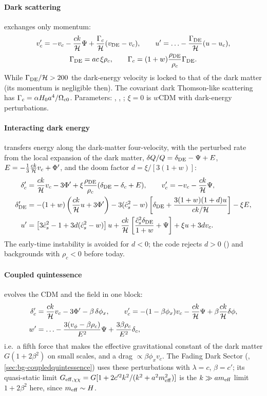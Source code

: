 \paragraph*{Dark scattering} \cite{Simpson2010,BaldiSimpson2015} exchanges only momentum:
\begin{gather}
v_c'=-v_c-\frac{ck}{\mathcal{H}}\Psi+\frac{\Gamma_c}{\mathcal{H}}(v_{\rm DE}-v_c),\qquad u'=\ldots-\frac{\Gamma_{\rm DE}}{\mathcal{H}}(u-u_c),\\
\Gamma_{\rm DE}=ac\,\xi\rho_c,\qquad \Gamma_c=(1+w)\frac{\rho_{\rm DE}}{\rho_c}\Gamma_{\rm DE}.
\end{gather}
While $\Gamma_{\rm DE}/\mathcal{H}>200$ the dark-energy velocity is locked to that of the dark matter (its momentum is negligible
then). The covariant dark Thomson-like scattering has $\Gamma_c=\alpha H_0a^4/\Omega_{c0}$. Parameters: ,
, ; $\xi=0$ is $w$CDM with dark-energy perturbations.

\paragraph*{Interacting dark energy} \cite{Valiviita2008} transfers energy along the dark-matter four-velocity, with
the perturbed rate from the local expansion of the dark matter, $\delta Q/Q=\delta_{\rm DE}-\Psi+E$,
$E=-\frac13\frac{ck}{\mathcal{H}}v_c+\Phi'$, and the doom factor $d=\xi/[3(1+w)]$:
\begin{align}
\delta_c'&=\frac{ck}{\mathcal{H}}v_c-3\Phi'+\xi\frac{\rho_{\rm DE}}{\rho_c}(\delta_{\rm DE}-\delta_c+E),\qquad v_c'=-v_c-\frac{ck}{\mathcal{H}}\Psi,\\
\delta_{\rm DE}'&=-(1+w)\left(\frac{ck}{\mathcal{H}}u+3\Phi'\right)-3(\hat c_s^2-w)\left[\delta_{\rm DE}+\frac{3(1+w)(1+d)u}{ck/\mathcal{H}}\right]-\xi E,\\
u'&=\left[3\hat c_s^2-1+3d(\hat c_s^2-w)\right]u+\frac{ck}{\mathcal{H}}\left[\frac{\hat c_s^2\delta_{\rm DE}}{1+w}+\Psi\right]+\xi u+3dv_c .
\end{align}
The early-time instability \cite{Valiviita2008} is avoided for $d<0$; the code rejects $d>0$ ()
and backgrounds with $\rho_c<0$ before today.

\paragraph*{Coupled quintessence} \cite{Wetterich1995,Amendola2000} evolves the CDM and the field in one block:
\begin{align}
\delta_c'&=\frac{ck}{\mathcal{H}}v_c-3\Phi'-\beta\,\delta\phi_x,\qquad
v_c'=-(1-\beta\phi_x)v_c-\frac{ck}{\mathcal{H}}\Psi+\beta\frac{ck}{\mathcal{H}}\delta\phi,\\
w'&=\ldots-\frac{3(v_\phi-\beta\rho_c)}{E^2}\Psi+\frac{3\beta\rho_c}{E^2}\delta_c,
\end{align}
i.e.\ a fifth force that makes the effective gravitational constant of the dark matter $G(1+2\beta^2)$ on small
scales, and a drag $\propto\beta\phi_xv_c$. The Fading Dark Sector \cite{ObiedVafaWu2026} (,
\cref{sec:bg-coupledquintessence}) uses these perturbations with $\lambda=c$, $\beta=c'$; its quasi-static limit
$G_{\rm eff,\chi\chi}=G[1+2c'^2k^2/(k^2+a^2m_{\rm eff}^2)]$ is the $k\gg am_{\rm eff}$ limit $1+2\beta^2$ here, since
$m_{\rm eff}\sim H$.

